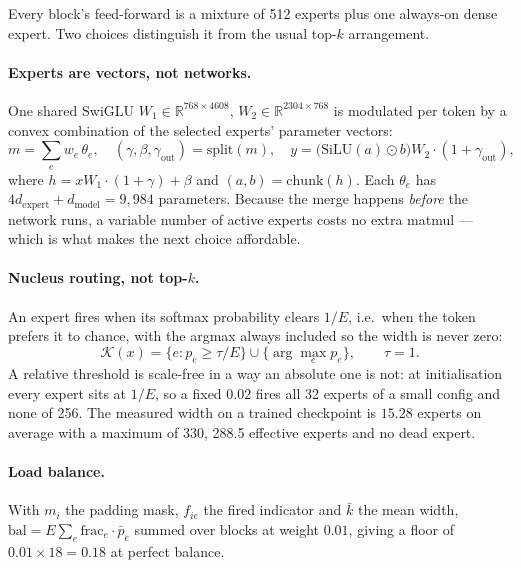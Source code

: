 \documentclass[11pt,a4paper]{article}
\begin{document}
Every block's feed-forward is a mixture of 512 experts plus one
always-on dense expert. Two choices distinguish it from the usual
top-$k$ arrangement.

\paragraph{Experts are vectors, not networks.} One shared SwiGLU
$W_1 \in \mathbb{R}^{768 \times 4608}$,
$W_2 \in \mathbb{R}^{2304 \times 768}$ is modulated per token by a convex
combination of the selected experts' parameter vectors:
\begin{equation}
m = \textstyle\sum_e w_e\,\theta_e,\quad
(\gamma, \beta, \gamma_{\text{out}}) = \mathrm{split}(m),\quad
y = \big(\mathrm{SiLU}(a)\odot b\big)W_2 \cdot (1+\gamma_{\text{out}}),
\end{equation}
where $h = xW_1 \cdot (1+\gamma) + \beta$ and $(a,b) = \mathrm{chunk}(h)$.
Each $\theta_e$ has $4 d_{\text{expert}} + d_{\text{model}} = 9{,}984$
parameters. Because the merge happens \emph{before} the network runs, a
variable number of active experts costs no extra matmul --- which is what
makes the next choice affordable.

\paragraph{Nucleus routing, not top-$k$.} An expert fires when its
softmax probability clears $1/E$, i.e.\ when the token prefers it to
chance, with the argmax always included so the width is never zero:
\begin{equation}
\mathcal{K}(x) = \{e : p_e \ge \tau/E\} \cup \{\arg\max_e p_e\},
\qquad \tau = 1 .
\end{equation}
A relative threshold is scale-free in a way an absolute one is not: at
initialisation every expert sits at $1/E$, so a fixed $0.02$ fires all 32
experts of a small config and none of 256. The measured width on a
trained checkpoint is $\mathbf{15.28}$ experts on average with a maximum
of 330, 288.5 effective experts and no dead expert.

\paragraph{Load balance.} With $m_i$ the padding mask, $f_{ie}$ the fired
indicator and $\bar{k}$ the mean width,
$\mathrm{bal} = E\sum_e \mathrm{frac}_e \cdot \bar{p}_e$ summed over
blocks at weight $0.01$, giving a floor of $0.01 \times 18 = 0.18$ at
perfect balance.
\end{document}
